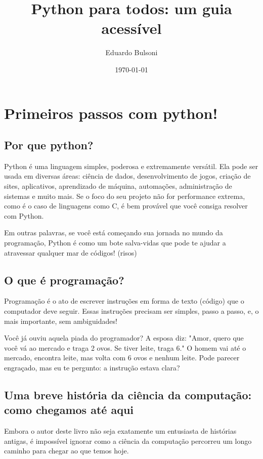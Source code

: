 \documentclass[12pt]{book}
\title{Python para todos: um guia acessível}
\author{Eduardo Bulsoni}
\date{\today}
\begin{document}
	\maketitle
	\tableofcontents
	\chapter{Primeiros passos com python!}
	
	\section{Por que python?}
	
	Python é uma linguagem simples, poderosa e extremamente versátil. Ela pode ser usada em diversas áreas: ciência de dados, desenvolvimento de jogos, criação de sites, aplicativos, aprendizado de máquina, automações, administração de sistemas e muito mais. Se o foco do seu projeto não for performance extrema, como é o caso de linguagens como C, é bem provável que você consiga resolver com Python.

	Em outras palavras, se você está começando sua jornada no mundo da programação, Python é como um bote salva-vidas que pode te ajudar a atravessar qualquer mar de códigos! (risos) \newline
	
	\section{O que é programação?}
	
	Programação é o ato de escrever instruções em forma de texto (código) que o computador deve seguir. Essas instruções precisam ser simples, passo a passo, e, o mais importante, sem ambiguidades!
	
	Você já ouviu aquela piada do programador? A esposa diz: "Amor, quero que você vá ao mercado e traga 2 ovos. Se tiver leite, traga 6." O homem vai até o mercado, encontra leite, mas volta com 6 ovos e nenhum leite. Pode parecer engraçado, mas eu te pergunto: a instrução estava clara?
	
	\section{Uma breve história da ciência da computação: como chegamos até aqui}
	
	Embora o autor deste livro não seja exatamente um entusiasta de histórias antigas, é impossível ignorar como a ciência da computação percorreu um longo caminho para chegar ao que temos hoje.
	
\end{document}
